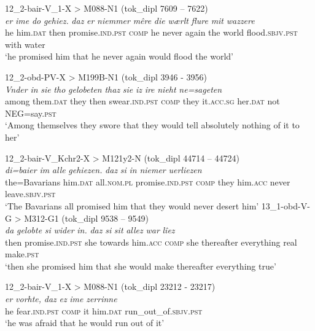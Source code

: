 \documentclass[output=paper,colorlinks,citecolor=brown]{langscibook}
\begin{document}
\ea 
\ea \label{ex:petrova_chen:petrova_chen:15a} 12\_2-bair-V\_1-X > M088-N1 (tok\_dipl 7609 – 7622)\\
\gll \textit{er} \textit{ime} \textit{do} \textit{gehiez.} \textit{daz} \textit{er} \textit{niemmer} \textit{mêre} \textit{die} \textit{wærlt} \textit{flure} \textit{mit} \textit{wazzere}\\
he him.\textsc{dat} then promise.\textsc{ind.pst} \textsc{comp} he never again the world flood.\textsc{sbjv.pst} with water\\
\glt ‘he promised him that he never again would flood the world’

\ex \label{ex:petrova_chen:petrova_chen:15b} 12\_2-obd-PV-X > M199B-N1 (tok\_dipl 3946 - 3956)\\
\gll \textit{Vnder} \textit{in} \textit{sie} \textit{tho} \textit{gelobeten} \textit{thaz} \textit{sie} \textit{iz} \textit{ire} \textit{nieht} \textit{ne=sageten}\\
among them.\textsc{dat} they then swear.\textsc{ind.pst} \textsc{comp} they it.\textsc{acc.sg} her.\textsc{dat} not NEG=say.\textsc{pst}\\
\glt ‘Among themselves they swore that they would tell absolutely nothing of it to her’

\ex \label{ex:petrova_chen:petrova_chen:15c} 12\_2-bair-V\_Kchr2-X > M121y2-N (tok\_dipl 44714 – 44724)\\
\gll \textit{di=baier} \textit{im} \textit{alle} \textit{gehiezen.} \textit{daz} \textit{si} \textit{in} \textit{niemer} \textit{uerliezen}\\
the=Bavarians him.\textsc{dat} all.\textsc{nom.pl} promise.\textsc{ind.pst} \textsc{comp} they him.\textsc{acc} never leave.\textsc{sbjv.pst}\\
\glt ‘The Bavarians all promised him that they would never desert him’
\ex \label{ex:petrova_chen:petrova_chen:15d} 13\_1-obd-V-G > M312-G1 (tok\_dipl 9538 – 9549)\\
\gll \textit{da} \textit{gelobte} \textit{si} \textit{wider} \textit{in.} \textit{daz} \textit{si} \textit{sit} \textit{allez} \textit{war} \textit{lîez}\\
then promise.\textsc{ind.pst} she towards him.\textsc{acc} \textsc{comp} she thereafter everything real make.\textsc{pst}\\
\glt ‘then she promised him that she would make thereafter everything true’

\ex \label{ex:petrova_chen:petrova_chen:15e} 12\_2-bair-V\_1-X > M088-N1 (tok\_dipl 23212 - 23217)\\
\gll \textit{er} \textit{vorhte,} \textit{daz} \textit{ez} \textit{ime} \textit{zerrinne}\\
he fear.\textsc{ind.pst} \textsc{comp} it him.\textsc{dat} run\_out\_of.\textsc{sbjv.pst}\\
\glt ‘he was afraid that he would run out of it’
\z
\z
\end{document}
